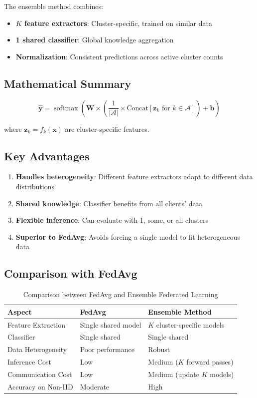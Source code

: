 \documentclass[11pt,a4paper]{article}
\newcommand{\softmax}{\operatorname{softmax}}
\begin{document}
The ensemble method combines:
\begin{itemize}
    \item \textbf{$K$ feature extractors}: Cluster-specific, trained on similar data
    \item \textbf{1 shared classifier}: Global knowledge aggregation
    \item \textbf{Normalization}: Consistent predictions across active cluster counts
\end{itemize}

\subsection{Mathematical Summary}

\begin{equation}
\hat{\mathbf{y}} = \softmax\left(\mathbf{W} \times \left(\frac{1}{|\mathcal{A}|} \times \text{Concat}[\mathbf{z}_k \text{ for } k \in \mathcal{A}]\right) + \mathbf{b}\right)
\end{equation}

where $\mathbf{z}_k = f_k(\mathbf{x})$ are cluster-specific features.

\subsection{Key Advantages}

\begin{enumerate}
    \item \textbf{Handles heterogeneity}: Different feature extractors adapt to different data distributions
    \item \textbf{Shared knowledge}: Classifier benefits from all clients' data
    \item \textbf{Flexible inference}: Can evaluate with 1, some, or all clusters
    \item \textbf{Superior to FedAvg}: Avoids forcing a single model to fit heterogeneous data
\end{enumerate}

\subsection{Comparison with FedAvg}

\begin{table}[h]
\centering
\begin{tabular}{@{}lll@{}}
\toprule
Aspect & FedAvg & Ensemble Method \\ \midrule
Feature Extraction & Single shared model & $K$ cluster-specific models \\
Classifier & Single shared & Single shared \\
Data Heterogeneity & Poor performance & Robust \\
Inference Cost & Low & Medium ($K$ forward passes) \\
Communication Cost & Low & Medium (update $K$ models) \\
Accuracy on Non-IID & Moderate & High \\
\bottomrule
\end{tabular}
\caption{Comparison between FedAvg and Ensemble Federated Learning}
\end{table}
\end{document}
